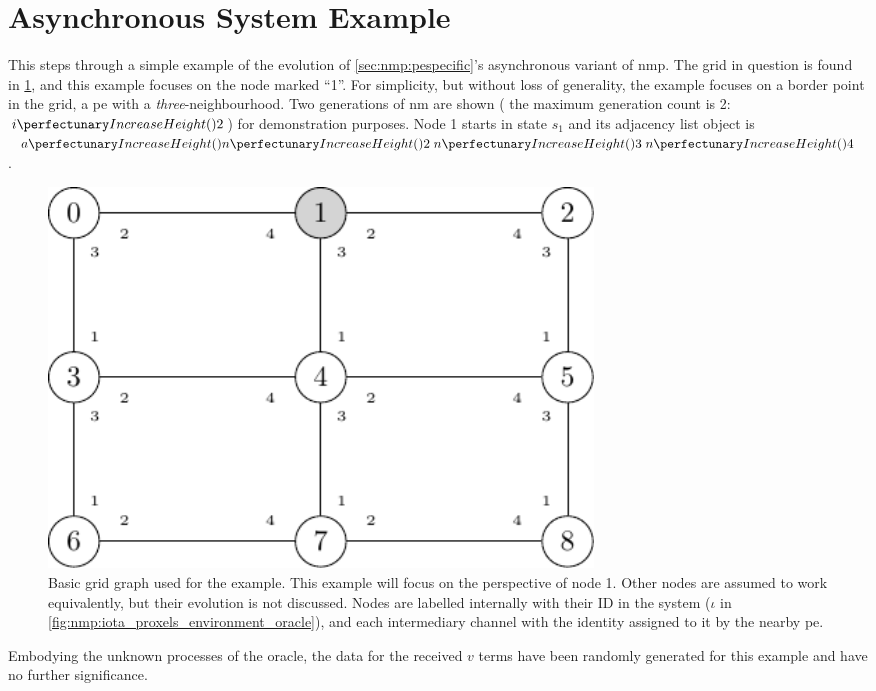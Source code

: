 \section{\label{sec:nmp:example}Asynchronous System Example}
\newcommand*{\obinnod}[1]{Objects inside node 1 at the end of round #1}
\newcommand*{\obinrul}[2]{Objects inside node 1 after application of rule#1 during round #2}

This  steps through a simple example of the evolution of \cref{sec:nmp:pespecific}'s asynchronous variant of \gls{nmp}.  The grid in question is found in \cref{fig:nmp:basicgrid}, and this example focuses on the node marked ``1''.  For simplicity, but without loss of generality, the example focuses on a border point in the grid, \ie{} a \gls{pe} with a \emph{three}-neighbourhood.  Two generations of \gls{nm} are shown (\ie{} the maximum generation count is 2: \(\cpfunc{i}{2}\)) for demonstration purposes.  Node 1 starts in state \(s_1\) and its adjacency list object is \(\cpfunc{a}{\cpfunc{n}{2} \; \cpfunc{n}{3} \;\cpfunc{n}{4}}\).

\begin{figure}
    \centering
    \includegraphics[keepaspectratio,width=0.7\textwidth,height=0.3\textheight]{chapters/nmp/images/3by3gridgraph.pdf}
    \caption[Basic  grid graph used for the example]{Basic  grid graph used for the example.  This example will focus on the perspective of node 1.  Other nodes are assumed to work equivalently, but their evolution is not discussed.  Nodes are labelled internally with their ID in the system (\(\iota\) in \cref{fig:nmp:iota_proxels_environment_oracle}), and each intermediary channel with the identity assigned to it by the nearby \gls{pe}.}
    \label{fig:nmp:basicgrid}
\end{figure}

Embodying the unknown processes of the oracle, the data for the received \(v\) terms have been randomly generated for this example and have no further significance.

